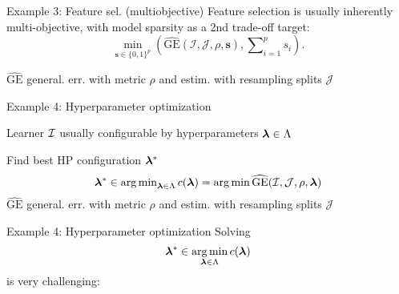 \documentclass[11pt,compress,t,notes=noshow, xcolor=table]{beamer}
\begin{document}
\begin{frame2}{Example 3: Feature sel. (multiobjective)}
Feature selection is usually inherently multi-objective,
with model sparsity as a 2nd trade-off target:
$$
\min_{\textbf{s} \in \{0, 1\}^p} \left(\widehat{\text{GE}}(\mathcal{I}, \mathcal{J}, \rho, \bm{s}), \sum\nolimits_{i = 1}^p s_i\right).
$$

$\widehat{\text{GE}}$ general. err. with metric $\rho$ and estim. with resampling splits $\mathcal{J}$
\spacer
{}
\end{frame2}


\begin{framei}{Example 4: Hyperparameter optimization}
\item Learner $\mathcal{I}$ usually configurable by hyperparameters $\bm{\lambda} \in \Lambda$
\item Find best HP configuration $\bm{\lambda}^\ast$
$$
\bm{\lambda}^\ast \in \mathop{\mathrm{arg\,min}}\nolimits_{\bm{\lambda} \in \Lambda} c(\bm{\lambda}) = \mathop{\mathrm{arg\,min}} \widehat{\text{GE}}(\mathcal{I}, \mathcal{J}, \rho, \bm{\lambda})
$$
$\widehat{\text{GE}}$ general. err. with metric $\rho$ and estim. with resampling splits $\mathcal{J}$
\spacer
{}
\end{framei}


\begin{frame2}{Example 4: Hyperparameter optimization}
Solving
$$
\bm{\lambda}^\ast \in \mathop{\mathrm{arg\,min}}_{\bm{\lambda} \in \Lambda} c(\bm{\lambda})
$$
is very challenging:
\end{frame2}
\end{document}
